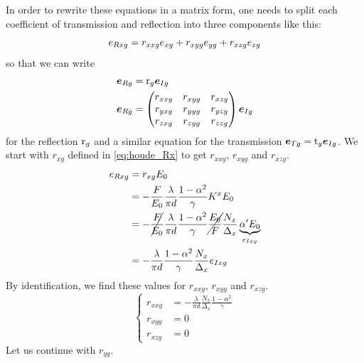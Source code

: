 In order to rewrite these equations in a matrix form, one needs to split each coefficient of transmission and reflection into three components like this:
\begin{equation}
    e_{R xg} = r_{xxg} e_{xg} + r_{xyg} e_{yg} + r_{xzg} e_{zg}
\end{equation}
so that we can write
\begin{align}
    \bm{e}_{R g} &= \mathrm{r}_g \bm{e}_{I g}
    \\
    \bm{e}_{R g} &=
    \begin{pmatrix}
        r_{xxg} & r_{xyg} & r_{xzg} \\
        r_{yxg} & r_{yyg} & r_{yzg} \\
        r_{zxg} & r_{zyg} & r_{zzg}
    \end{pmatrix}
    \bm{e}_{I g}
\end{align}
for the reflection $\mathrm{r}_g$ and a similar equation
for the transmission $\bm{e}_{T g} = \mathrm{t}_g \bm{e}_{I g}$.
We start with $r_{xg}$ defined in \cref{eq:houde_Rx} to get $r_{xxg}$, $r_{xyg}$ and $r_{xzg}$.
\begin{align*}
    e_{R xg} &= r_{xg} E_0
    \\
           &= -\frac{F}{E_0}
              \frac{\lambda}{\pi d}
              \frac{1-\alpha^2}{\gamma}
              K^x
              E_0
    \\
           &= -\cancel{\frac{F}{E_0}}
              \frac{\lambda}{\pi d}
              \frac{1-\alpha^2}{\gamma}
              \cancel{\frac{E_0}{F}}
              \frac{N_x}{\Delta_x}
              \underbrace{
                  \alpha'
                  E_0
              }_{e_{I xg}}
    \\
           &= -\frac{\lambda}{\pi d}
              \frac{1-\alpha^2}{\gamma}
              \frac{N_x}{\Delta_x}
              e_{I xg}
\end{align*}
By identification, we find these values for $r_{xxg}$, $r_{xyg}$ and $r_{xzg}$.
\begin{equation}
    \left\lbrace
    \begin{aligned}
        r_{xxg} &= -\frac{\lambda}{\pi d}
                  \frac{N_x}{\Delta_x}
                  \frac{1-\alpha^2}{\gamma}
        \\
        r_{xyg} &= 0
        \\
        r_{xzg} &= 0
    \end{aligned}
    \right.
\end{equation}
Let us continue with $r_{yg}$.
